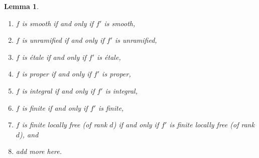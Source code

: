 \documentclass[10pt,a4paper]{amsart}
\theoremstyle{plain}
\newtheorem{lemma}[subsection]{Lemma}
\theoremstyle{definition}
\theoremstyle{remark}
\numberwithin{equation}{subsection}
\begin{document}
\begin{lemma}
\begin{enumerate}
\label{item-syntomic}
\item $f$ is smooth if and only if $f'$ is smooth,
\label{item-smooth}
\item $f$ is unramified if and only if $f'$ is unramified,
\label{item-unramified}
\item $f$ is \'etale if and only if $f'$ is \'etale,
\label{item-etale}
\item $f$ is proper if and only if $f'$ is proper,
\label{item-proper}
\item $f$ is integral if and only if $f'$ is integral,
\label{item-integral}
\item $f$ is finite if and only if $f'$ is finite,
\label{item-finite}
\item
\label{item-finite-locally-free}
$f$ is finite locally free (of rank $d$) if and only if $f'$
is finite locally free (of rank $d$), and
\item add more here.
\end{enumerate}
\end{lemma}
\end{document}
